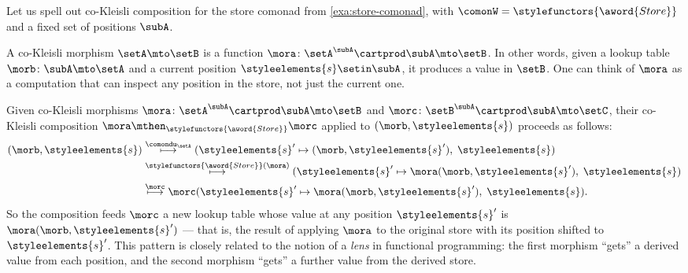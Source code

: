 \begin{example}
\label{exa:cokleisli-store}

Let us spell out co-Kleisli composition for the store comonad from \cref{exa:store-comonad}, with $\comonW = \stylefunctors{\aword{Store}}$ and a fixed set of positions $\subA$.

A co-Kleisli morphism $\setA \mto \setB$ is a function $\mora \colon \setA^{\subA} \cartprod \subA \mto \setB$. In other words, given a lookup table $\morb \colon \subA \mto \setA$ and a current position $\styleelements{s} \setin \subA$, it produces a value in $\setB$. One can think of $\mora$ as a computation that can inspect any position in the store, not just the current one.

Given co-Kleisli morphisms $\mora \colon \setA^{\subA} \cartprod \subA \mto \setB$ and $\morc \colon \setB^{\subA} \cartprod \subA \mto \setC$, their co-Kleisli composition $\mora \mthen_{\stylefunctors{\aword{Store}}} \morc$ applied to $(\morb, \styleelements{s})$ proceeds as follows:
\begin{equation*}
\begin{split}
(\morb, \styleelements{s})
& \overset{\comondu_\setA}{\longmapsto} (\styleelements{s}' \mapsto (\morb, \styleelements{s}'),\; \styleelements{s}) \\
& \overset{\stylefunctors{\aword{Store}}(\mora)}{\longmapsto} (\styleelements{s}' \mapsto \mora(\morb, \styleelements{s}'),\; \styleelements{s}) \\
& \overset{\morc}{\longmapsto} \morc(\styleelements{s}' \mapsto \mora(\morb, \styleelements{s}'),\; \styleelements{s}).
\end{split}
\end{equation*}
So the composition feeds $\morc$ a new lookup table whose value at any position $\styleelements{s}'$ is $\mora(\morb, \styleelements{s}')$ --- that is, the result of applying $\mora$ to the original store with its position shifted to $\styleelements{s}'$. This pattern is closely related to the notion of a \emph{lens} in functional programming: the first morphism ``gets'' a derived value from each position, and the second morphism ``gets'' a further value from the derived store.
\end{example}


